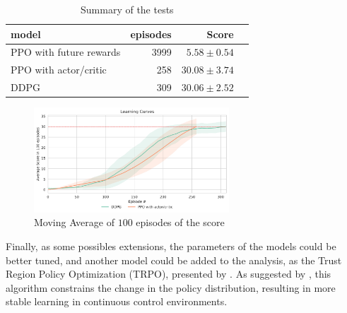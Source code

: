 \documentclass[a4paper]{article}
\begin{document}
\begin{table}[ht!]
\centering
\begin{tabular}{lrrr}
{model} &  episodes &  Score \\
\midrule
PPO with future rewards &      3999 &    $5.58\pm0.54$ \\
PPO with actor/critic   &       258 &   $30.08\pm3.74$ \\
DDPG                    &       309 &   $30.06\pm2.52$ \\

\end{tabular}
\caption{\label{tab:final_results}Summary of the tests}
\end{table}



\begin{figure}[ht]
\centering
\includegraphics[width=0.65\textwidth]{../notebooks/figures/2018-10-22-final-comparition.jpg}
\caption{Moving Average of $100$ episodes of the score}
\label{fig:final_comp}
\end{figure}


Finally, as some possibles extensions, the parameters of the models could be better tuned, and another model could be added to the analysis, as the Trust Region Policy Optimization (TRPO), presented by \cite{Schulman:2015uk}. As suggested by \cite{Duan:2016ur}, this algorithm constrains the change in the policy distribution, resulting in more stable learning in continuous control environments.









\end{document}
